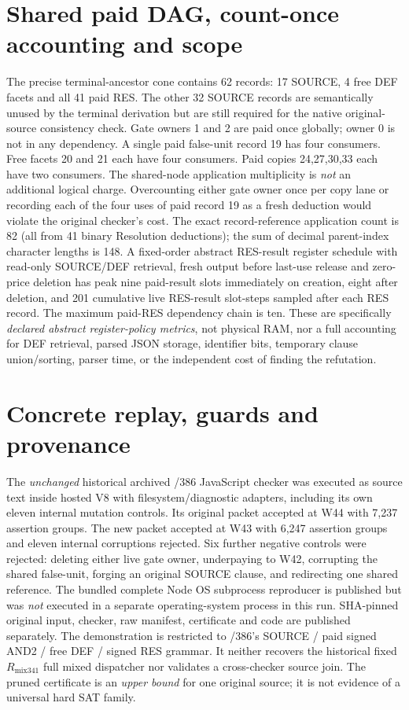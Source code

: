 \documentclass[11pt]{article}
\begin{document}
\section*{Shared paid DAG, count-once accounting and scope}
The precise terminal-ancestor cone contains 62 records: 17 SOURCE, 4 free DEF facets and all 41 paid RES. The other 32 SOURCE records are semantically unused by the terminal derivation but are still required for the native original-source consistency check. Gate owners 1 and 2 are paid once globally; owner 0 is not in any dependency. A single paid false-unit record 19 has four consumers. Free facets 20 and 21 each have four consumers. Paid copies 24,27,30,33 each have two consumers. The shared-node application multiplicity is \emph{not} an additional logical charge. Overcounting either gate owner once per copy lane or recording each of the four uses of paid record 19 as a fresh deduction would violate the original checker's cost.
The exact record-reference application count is 82 (all from 41 binary Resolution deductions); the sum of decimal parent-index character lengths is 148. A fixed-order abstract RES-result register schedule with read-only SOURCE/DEF retrieval, fresh output before last-use release and zero-price deletion has peak nine paid-result slots immediately on creation, eight after deletion, and 201 cumulative live RES-result slot-steps sampled after each RES record. The maximum paid-RES dependency chain is ten. These are specifically \emph{declared abstract register-policy metrics}, not physical RAM, nor a full accounting for DEF retrieval, parsed JSON storage, identifier bits, temporary clause union/sorting, parser time, or the independent cost of finding the refutation.

\section*{Concrete replay, guards and provenance}
The \emph{unchanged} historical archived /386 JavaScript checker was executed as source text inside hosted V8 with filesystem/diagnostic adapters, including its own eleven internal mutation controls. Its original packet accepted at W44 with 7,237 assertion groups. The new packet accepted at W43 with 6,247 assertion groups and eleven internal corruptions rejected. Six further negative controls were rejected: deleting either live gate owner, underpaying to W42, corrupting the shared false-unit, forging an original SOURCE clause, and redirecting one shared reference. The bundled complete Node OS subprocess reproducer is published but was \emph{not} executed in a separate operating-system process in this run. SHA-pinned original input, checker, raw manifest, certificate and code are published separately.
The demonstration is restricted to /386's SOURCE / paid signed AND2 / free DEF / signed RES grammar. It neither recovers the historical fixed \(R_{\mathrm{mix341}}\) full mixed dispatcher nor validates a cross-checker source join. The pruned certificate is an \emph{upper bound} for one original source; it is not evidence of a universal hard SAT family.
\end{document}

